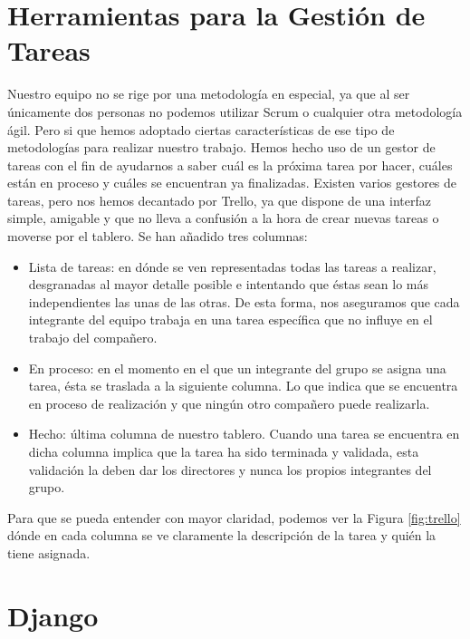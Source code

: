 \section{Herramientas para la Gestión de Tareas}
\label{cap:sec:herramientasGestionTareas}
Nuestro equipo no se rige por una metodología en especial, ya que al ser únicamente dos personas no podemos utilizar Scrum o cualquier otra metodología ágil. Pero si que hemos adoptado ciertas características de ese tipo de metodologías para realizar nuestro trabajo.
Hemos hecho uso de un gestor de tareas con el fin de ayudarnos a saber cuál es la próxima tarea por hacer, cuáles están en proceso y cuáles se encuentran ya finalizadas. Existen varios gestores de tareas, pero nos hemos decantado por Trello, ya que dispone de una interfaz simple, amigable y que no lleva a confusión a la hora de crear nuevas tareas o moverse por el tablero.
Se han añadido tres columnas:
\begin{itemize}
	\item Lista de tareas: en dónde se ven representadas todas las tareas a realizar, desgranadas al mayor detalle posible e intentando que éstas sean lo más independientes las unas de las otras. De esta forma, nos aseguramos que cada integrante del equipo trabaja en una tarea específica que no influye en el trabajo del compañero.
	\item En proceso: en el momento en el que un integrante del grupo se asigna una tarea, ésta se traslada a la siguiente columna. Lo que indica que se encuentra en proceso de realización y que ningún otro compañero puede realizarla. 
	\item Hecho: última columna de nuestro tablero. Cuando una tarea se encuentra en dicha columna implica que la tarea ha sido terminada y validada, esta validación la deben dar los directores y nunca los propios integrantes del grupo.
	
\end{itemize}

Para que se pueda entender con mayor claridad, podemos ver la Figura \ref{fig:trello} dónde en cada columna se ve claramente la descripción de la tarea y quién la tiene asignada.
\section{Django}
\label{cap:sec:django}


